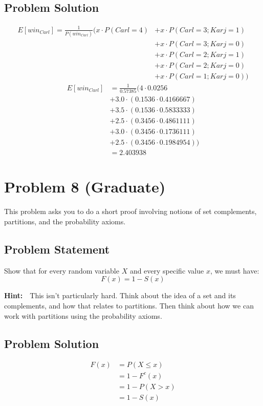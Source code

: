 \documentclass[12pt]{article}
\theoremstyle{definition}
\begin{document}
\subsection*{Problem Solution}
\begin{align*}
E[win_{Carl}] = \frac{1}{P(win_{Carl})}(x\cdot P(Carl = 4) &+ x\cdot P(Carl = 3; Karj = 1)\\
&+ x\cdot P(Carl = 3; Karj = 0) \\
&+ x\cdot P(Carl = 2; Karj = 1) \\
&+ x\cdot P(Carl = 2; Karj = 0) \\
&+ x\cdot P(Carl = 1; Karj = 0))
\end{align*}
\begin{align*}
E[win_{Carl}] &= \frac{1}{0.57385}(4 \cdot  0.0256 \\
&+ 3.0 \cdot  (0.1536 \cdot  0.4166667) \\
&+ 3.5\cdot (0.1536 \cdot  0.5833333)\\
&+ 2.5\cdot (0.3456\cdot 0.4861111) \\
&+ 3.0\cdot (0.3456\cdot 0.1736111)\\
&+ 2.5\cdot (0.3456\cdot 0.1984954))\\
&= 2.403938
\end{align*}


\newpage
\section*{Problem 8 (Graduate)}

This problem asks you to do a short proof involving notions of set complements, partitions, and the probability axioms.

\subsection*{Problem Statement}

Show that for every random variable $X$ and every specific value $x$, we must have:
$$
F(x) = 1 - S(x)
$$

\bigskip
\noindent
{\bf Hint:}\ \ This isn't particularly hard. Think about the idea of a set and its complements, and how that relates to partitions. Then think about how we can work with partitions using the probability axioms.



\subsection*{Problem Solution}
\begin{align*}
F(x) &= P(X \leq x)\\
&= 1 - F^c(x) \\
&= 1 - P(X > x)\\
&= 1 - S(x)\\
\end{align*}
\end{document}

